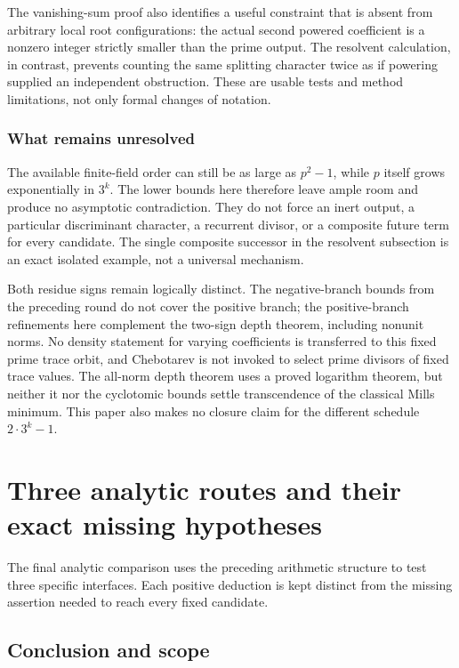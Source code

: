 \documentclass[11pt,a4paper]{article}
\theoremstyle{definition}\newtheorem{definition}[theorem]{Definition}
\theoremstyle{remark}\newtheorem{remark}[theorem]{Remark}
\begin{document}
The vanishing-sum proof also identifies a useful constraint that is absent
from arbitrary local root configurations: the actual second powered
coefficient is a nonzero integer strictly smaller than the prime output.
The resolvent calculation, in contrast, prevents counting the same
splitting character twice as if powering supplied an independent
obstruction. These are usable tests and method limitations, not only
formal changes of notation.


\subsubsection{What remains unresolved}

The available finite-field order can still be as large as $p^2-1$, while
$p$ itself grows exponentially in $3^k$. The lower bounds here therefore
leave ample room and produce no asymptotic contradiction. They do not
force an inert output, a particular discriminant character, a recurrent
divisor, or a composite future term for every candidate. The single
composite successor in the resolvent subsection is an exact isolated example, not a
universal mechanism.

Both residue signs remain logically distinct. The negative-branch bounds
from the preceding round do not cover the positive branch; the positive-branch refinements here complement the two-sign depth theorem, including nonunit norms. No density
statement for varying coefficients is transferred to this fixed prime
trace orbit, and Chebotarev is not invoked to select prime divisors of
fixed trace values. The all-norm depth theorem uses a proved logarithm
theorem, but neither it nor the cyclotomic bounds settle transcendence of
the classical Mills minimum. This paper also makes no closure claim for
the different schedule $2\cdot3^k-1$.




\endgroup

\section{Three analytic routes and their exact missing hypotheses}\label{src:R18}
The final analytic comparison uses the preceding arithmetic structure to test three specific interfaces. Each positive deduction is kept distinct from the missing assertion needed to reach every fixed candidate.
\medskip
\begingroup




\subsection{Conclusion and scope}
\end{document}
